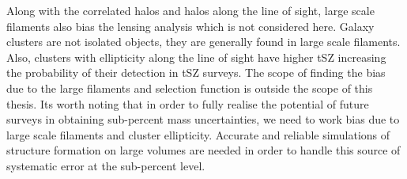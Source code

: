 Along with the correlated halos and halos along the line of sight, large scale filaments also bias the lensing analysis which is not considered here. 
Galaxy clusters are not isolated objects, they are generally found in large scale filaments. 
Also, clusters with ellipticity along the line of sight have higher tSZ increasing the probability of their detection in tSZ surveys. 
The scope of finding the bias due to the large filaments and selection function is outside the scope of this thesis. 
Its worth noting that in order to fully realise the potential of future surveys in obtaining sub-percent mass uncertainties, we need to work bias due to large scale filaments and cluster ellipticity.
Accurate and reliable simulations of structure formation on large volumes are needed in order to handle this source of systematic error at the sub-percent level.

